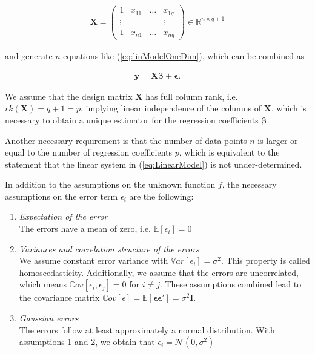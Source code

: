 \documentclass[10pt,a4paper]{article}
\begin{document}
\begin{align}
	\boldsymbol{X} = \begin{pmatrix}   1     & x_{11} & \dots & x_{1q} \\ 
								  	  \vdots &        &       & \vdots \\ 
				  		  			   1     & x_{n1} & \dots & x_{nq}  
		\end{pmatrix} \in \mathbb{R}^{n \times q+1}		
\end{align}

and generate $n$ equations like (\ref{eq:linModelOneDim}), which can be combined as 

\begin{align} \label{eq:LinearModel}
	\boldsymbol{y} = \boldsymbol{X}\boldsymbol{\beta} + \boldsymbol{\epsilon}.
\end{align}

We assume that the design matrix $\boldsymbol{X}$ has full column rank, i.e. $rk(\boldsymbol{X}) = q + 1 = p$, implying linear independence of the columns of $\boldsymbol{X}$, which is necessary to obtain a unique estimator for the regression coefficients $\boldsymbol{\beta}$. \cite{fahrmeir2013regression}

Another necessary requirement is that the number of data points $n$ is larger or equal to the number of regression coefficients $p$, which is equivalent to the statement that the linear system in (\ref{eq:LinearModel}) is not under-determined.

In addition to the assumptions on the unknown function $f$, the necessary assumptions on the error term $\epsilon_i$ are the following:

\begin{enumerate}
	\item \emph{Expectation of the error} \\
	The errors have a mean of zero, i.e. $\mathbb E[\epsilon_i] = 0$

	\item \emph{Variances and correlation structure of the errors} \\
	We assume constant error variance with $\mathbb Var[\epsilon_i] = \sigma^2$. This property is called homoscedasticity. Additionally, we assume that the errors are uncorrelated, which means $\mathbb Cov[\epsilon_i, \epsilon_j] = 0$ for $i \ne j$. These assumptions combined lead to the covariance matrix $\mathbb Cov[\epsilon] = \mathbb E[\boldsymbol{\epsilon} \boldsymbol{\epsilon}'] = \sigma^2 \boldsymbol{I}$.

	\item \emph{Gaussian errors} \\
	The errors follow at least approximately a normal distribution. With assumptions 1 and 2, we obtain that $\epsilon_i = \mathcal N(0, \sigma^2)$ 
\end{enumerate}
\end{document}
